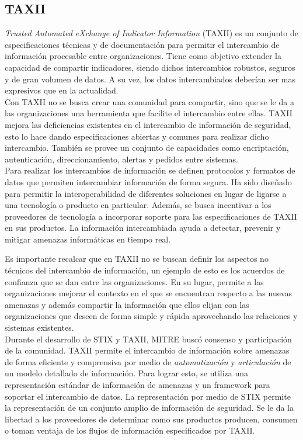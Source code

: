 \subsection{TAXII}

\textit{Trusted Automated eXchange of Indicator Information} (TAXII) es un conjunto de especificaciones técnicas y de documentación para permitir el intercambio de información procesable entre organizaciones.
Tiene como objetivo extender la capacidad de compartir indicadores, 
siendo dichos intercambios robustos, seguros y de gran volumen de datos. A su 
vez, los datos intercambiados deberían ser mas expresivos que en la actualidad.\\

Con TAXII no se busca crear una comunidad para compartir, sino que se le da a 
las organizaciones una herramienta que facilite el intercambio entre ellas. 
TAXII mejora las deficiencias existentes en el intercambio de información de seguridad, esto lo hace dando especificaciones abiertas y comunes para realizar dicho intercambio. También se provee un 
conjunto de capacidades como encriptación, autenticación, direccionamiento, 
alertas y pedidos entre sistemas.\\

Para realizar los intercambios de información se definen protocolos y formatos de datos que 
permiten intercambiar información de forma segura. Ha sido diseñado para permitir la
interoperabilidad de diferentes soluciones en lugar de ligarse a una tecnología o producto en particular.
Además, se busca incentivar a los proveedores de tecnología a incorporar soporte para las especificaciones
de TAXII en sus productos. La información intercambiada 
ayuda a detectar, prevenir y mitigar amenazas informáticas en tiempo real. 

Es importante recalcar que en TAXII no se buscan definir los aspectos no técnicos del intercambio de información, un ejemplo de esto es los acuerdos de confianza que se dan entre las organizaciones. En su lugar, permite a las organizaciones mejorar el 
contexto en el que se encuentran respecto a las nuevas amenazas y además 
compartir la información que ellos elijan con las organizaciones que deseen de 
forma simple y rápida aprovechando las relaciones y sistemas existentes.\\

Durante el desarrollo de STIX y TAXII, MITRE buscó consenso y participación de la comunidad. 
TAXII permite el intercambio de información sobre amenazas de forma eficiente y 
comprensiva por medio de \emph{automatización} y \emph{articulación} de un 
modelo detallado de información. Para lograr esto, se utiliza una representación 
estándar de información de amenazas y un framework para soportar el intercambio 
de datos. La representación por medio de STIX permite la representación de un conjunto amplio de información de seguridad. Se le da la libertad a los proveedores de determinar como sus 
productos producen, consumen o toman ventaja de los flujos de información 
especificados por TAXII.\\

